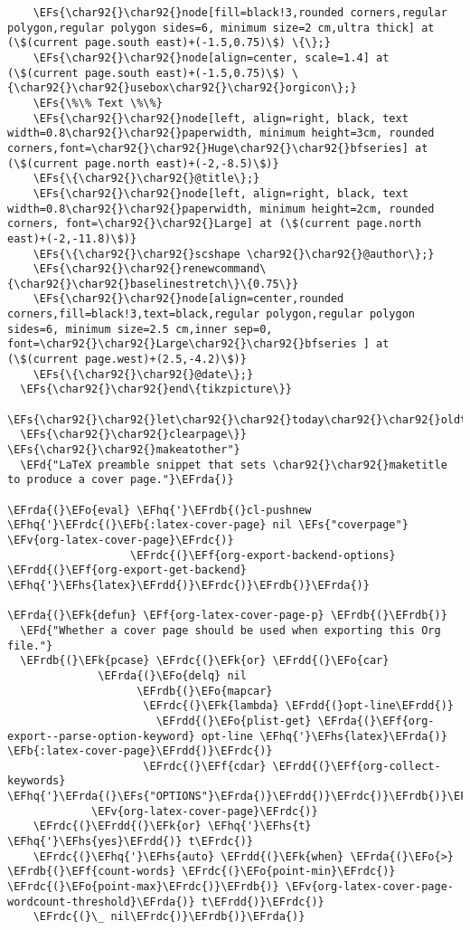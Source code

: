 \documentclass{article}
\newcommand{\EFs}[1]{\textcolor{EFs}{#1}} %
\newcommand{\EFd}[1]{\textcolor{EFd}{#1}} %
\newcommand{\EFk}[1]{\textcolor{EFk}{#1}} %
\newcommand{\EFb}[1]{\textcolor{EFb}{#1}} %
\newcommand{\EFf}[1]{\textcolor{EFf}{#1}} %
\newcommand{\EFv}[1]{\textcolor{EFv}{#1}} %
\newcommand{\EFo}[1]{\textcolor{EFo}{#1}} %
\newcommand{\EFhq}[1]{#1} %
\newcommand{\EFhs}[1]{\textcolor{EFhs}{#1}} %
\newcommand{\EFrda}[1]{\textcolor{EFrda}{#1}} %
\newcommand{\EFrdb}[1]{\textcolor{EFrdb}{#1}} %
\newcommand{\EFrdc}[1]{\textcolor{EFrdc}{#1}} %
\newcommand{\EFrdd}[1]{\textcolor{EFrdd}{#1}} %
\begin{document}
\begin{Code}
\begin{Verbatim}
    \EFs{\char92{}\char92{}node[fill=black!3,rounded corners,regular polygon,regular polygon sides=6, minimum size=2 cm,ultra thick] at (\$(current page.south east)+(-1.5,0.75)\$) \{\};}
    \EFs{\char92{}\char92{}node[align=center, scale=1.4] at (\$(current page.south east)+(-1.5,0.75)\$) \{\char92{}\char92{}usebox\char92{}\char92{}orgicon\};}
    \EFs{\%\% Text \%\%}
    \EFs{\char92{}\char92{}node[left, align=right, black, text width=0.8\char92{}\char92{}paperwidth, minimum height=3cm, rounded corners,font=\char92{}\char92{}Huge\char92{}\char92{}bfseries] at (\$(current page.north east)+(-2,-8.5)\$)}
    \EFs{\{\char92{}\char92{}@title\};}
    \EFs{\char92{}\char92{}node[left, align=right, black, text width=0.8\char92{}\char92{}paperwidth, minimum height=2cm, rounded corners, font=\char92{}\char92{}Large] at (\$(current page.north east)+(-2,-11.8)\$)}
    \EFs{\{\char92{}\char92{}scshape \char92{}\char92{}@author\};}
    \EFs{\char92{}\char92{}renewcommand\{\char92{}\char92{}baselinestretch\}\{0.75\}}
    \EFs{\char92{}\char92{}node[align=center,rounded corners,fill=black!3,text=black,regular polygon,regular polygon sides=6, minimum size=2.5 cm,inner sep=0, font=\char92{}\char92{}Large\char92{}\char92{}bfseries ] at (\$(current page.west)+(2.5,-4.2)\$)}
    \EFs{\{\char92{}\char92{}@date\};}
  \EFs{\char92{}\char92{}end\{tikzpicture\}}
  \EFs{\char92{}\char92{}let\char92{}\char92{}today\char92{}\char92{}oldtoday}
  \EFs{\char92{}\char92{}clearpage\}}
\EFs{\char92{}\char92{}makeatother"}
  \EFd{"LaTeX preamble snippet that sets \char92{}\char92{}maketitle to produce a cover page."}\EFrda{)}

\EFrda{(}\EFo{eval} \EFhq{'}\EFrdb{(}cl-pushnew \EFhq{'}\EFrdc{(}\EFb{:latex-cover-page} nil \EFs{"coverpage"} \EFv{org-latex-cover-page}\EFrdc{)}
                   \EFrdc{(}\EFf{org-export-backend-options} \EFrdd{(}\EFf{org-export-get-backend} \EFhq{'}\EFhs{latex}\EFrdd{)}\EFrdc{)}\EFrdb{)}\EFrda{)}

\EFrda{(}\EFk{defun} \EFf{org-latex-cover-page-p} \EFrdb{(}\EFrdb{)}
  \EFd{"Whether a cover page should be used when exporting this Org file."}
  \EFrdb{(}\EFk{pcase} \EFrdc{(}\EFk{or} \EFrdd{(}\EFo{car}
              \EFrda{(}\EFo{delq} nil
                    \EFrdb{(}\EFo{mapcar}
                     \EFrdc{(}\EFk{lambda} \EFrdd{(}opt-line\EFrdd{)}
                       \EFrdd{(}\EFo{plist-get} \EFrda{(}\EFf{org-export--parse-option-keyword} opt-line \EFhq{'}\EFhs{latex}\EFrda{)} \EFb{:latex-cover-page}\EFrdd{)}\EFrdc{)}
                     \EFrdc{(}\EFf{cdar} \EFrdd{(}\EFf{org-collect-keywords} \EFhq{'}\EFrda{(}\EFs{"OPTIONS"}\EFrda{)}\EFrdd{)}\EFrdc{)}\EFrdb{)}\EFrda{)}\EFrdd{)}
             \EFv{org-latex-cover-page}\EFrdc{)}
    \EFrdc{(}\EFrdd{(}\EFk{or} \EFhq{'}\EFhs{t} \EFhq{'}\EFhs{yes}\EFrdd{)} t\EFrdc{)}
    \EFrdc{(}\EFhq{'}\EFhs{auto} \EFrdd{(}\EFk{when} \EFrda{(}\EFo{>} \EFrdb{(}\EFf{count-words} \EFrdc{(}\EFo{point-min}\EFrdc{)} \EFrdc{(}\EFo{point-max}\EFrdc{)}\EFrdb{)} \EFv{org-latex-cover-page-wordcount-threshold}\EFrda{)} t\EFrdd{)}\EFrdc{)}
    \EFrdc{(}\_ nil\EFrdc{)}\EFrdb{)}\EFrda{)}


\end{Verbatim}
\end{Code}
\end{document}
